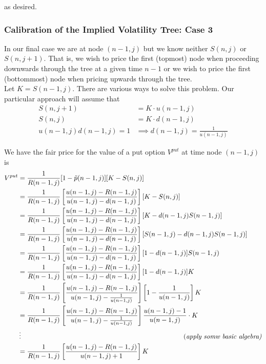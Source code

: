 \documentclass[12pt]{article}
\newlength\tindent
\renewcommand{\indent}{\hspace*{\tindent}}
\begin{document}
as desired.

\subsubsection{Calibration of the Implied Volatility Tree: Case 3}

\indent In our final case we are at node $(n - 1, j)$ but we know neither $S(n, j)$ or $S(n, j + 1)$. That is, we wish to price the first (topmost) node when proceeding downwards through the tree at a given time $n - 1$ or we wish to price the first (bottommost) node when pricing upwards through the tree. \\

Let $K = S(n - 1, j)$. There are various ways to solve this problem. Our particular approach will assume that
\begin{align*}
	S(n, j + 1) &= K\cdot u(n - 1, j) \\
	S(n,j) &= K \cdot d(n - 1, j) \\
	u(n - 1, j)d(n - 1, j) = 1 &\implies d(n - 1, j) = \frac{1}{u(n - 1, j)} 
\end{align*}

We have the fair price for the value of a put option $V^{put}$ at time node $(n - 1, j)$ is
\begin{align*}
	V^{put} &= \frac{1}{R(n - 1, j)} [1 - \tilde{p}(n - 1, j)][K - S(n, j)] \\
	&= \frac{1}{R(n - 1, j)} \left[ \frac{u(n - 1, j) - R(n - 1, j)}{u(n - 1,j) - d(n - 1, j)} \right][ K - S(n, j)] \\
	&= \frac{1}{R(n - 1, j)} \left[ \frac{u(n - 1, j) - R(n - 1, j)}{u(n - 1,j) - d(n - 1, j)} \right][ K - d(n - 1, j) S(n - 1, j)] \\
	&= \frac{1}{R(n - 1, j)} \left[ \frac{u(n - 1, j) - R(n - 1, j)}{u(n - 1,j) - d(n - 1, j)} \right][ S(n - 1, j) - d(n - 1, j) S(n - 1, j)] \\
	&= \frac{1}{R(n - 1, j)} \left[ \frac{u(n - 1, j) - R(n - 1, j)}{u(n - 1,j) - d(n - 1, j)} \right][1 - d(n - 1, j)] S(n - 1, j) \\
	&= \frac{1}{R(n - 1, j)} \left[ \frac{u(n - 1, j) - R(n - 1, j)}{u(n - 1,j) - d(n - 1, j)} \right][1 - d(n - 1, j)] K  \\
	&= \frac{1}{R(n - 1, j)} \left[ \frac{u(n - 1, j) - R(n - 1, j)}{u(n - 1,j) - \frac{1}{u(n - 1, j)}} \right] \left[1 - \frac{1}{u(n - 1, j)} \right]  K  \\	
	&= \frac{1}{R(n - 1, j)} \left[ \frac{u(n - 1, j) - R(n - 1, j)}{u(n - 1,j) - \frac{1}{u(n - 1, j)}} \right] \frac{u(n - 1, j) - 1} {u(n - 1, j)} \cdot  K  \\		
	&\vdots \hphantom{{}={-----------------------}} \text{{(\em apply somw basic algebra)}} \\
	&= \frac{1}{R(n - 1, j)} \left[ \frac{u(n - 1, j) - R(n - 1, j)}{u(n - 1,j) + 1} \right] K  \\		
\end{align*}
\end{document}
